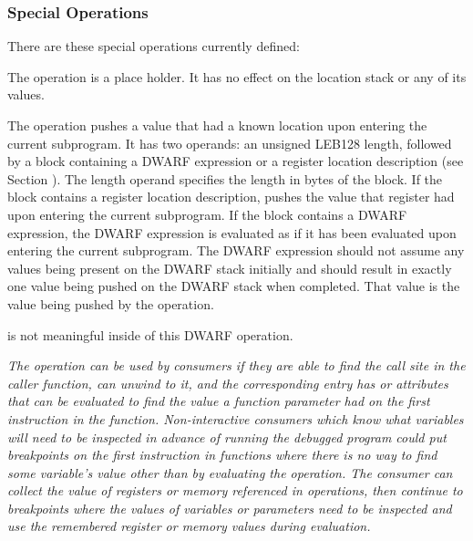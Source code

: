 \subsubsection{Special Operations}
\label{chap:specialoperations}
There 
are these special operations currently defined:
\begin{enumerate}[1. ]
\itembfnl{\DWOPnopNAME}
The \DWOPnopTARG{} operation is a place holder. It has no effect
on the location stack or any of its values.

\itembfnl{\DWOPentryvalueNAME}
The \DWOPentryvalueTARG{} operation pushes a value that had a known location
upon entering the current subprogram.  It has two operands: an 
unsigned LEB128 length, followed by 
a block containing a DWARF expression or a register location description 
(see Section ).  
The length operand specifies the length
in bytes of the block.  If the block contains a register location
description, \DWOPentryvalueNAME{} pushes the value that register had upon
entering the current subprogram.  If the block contains a DWARF expression,
the DWARF expression is evaluated as if it has been evaluated upon entering
the current subprogram.  The DWARF expression should not assume any values
being present on the DWARF stack initially and should result in exactly one
value being pushed on the DWARF stack when completed.  That value is the value
being pushed by the \DWOPentryvalueNAME{} operation.  

\DWOPpushobjectaddress{} is not meaningful inside of this DWARF operation.

\textit{The \DWOPentryvalueNAME{} operation can be used by consumers if they are able
to find the call site in the caller function, can unwind to it, and the corresponding
\DWTAGcallsiteparameter{} entry has \DWATcallvalue{} or
\DWATcalldatavalue{} attributes that can be evaluated to find the
value a function parameter had on the first instruction in the function.
Non-interactive consumers which know what variables will need to be
inspected in advance of running the debugged program could put breakpoints
on the first instruction in functions where there is no way to find
some variable's value other than by evaluating the \DWOPentryvalueNAME{} 
operation.  The consumer can collect the value of registers or 
memory referenced in
\DWOPentryvalueNAME{} operations, then continue to breakpoints where the values
of variables or parameters need to be inspected and use the remembered
register or memory values during \DWOPentryvalueNAME{} evaluation.}

\end{enumerate}

